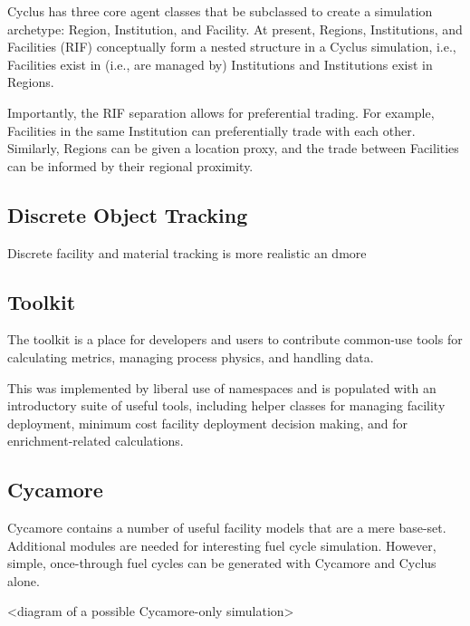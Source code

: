 Cyclus has three core agent classes that be subclassed to create a simulation
archetype: Region, Institution, and Facility. At present, Regions, Institutions,
and Facilities (RIF) conceptually form a nested structure in a Cyclus simulation,
i.e., Facilities exist in (i.e., are managed by) Institutions and Institutions
exist in Regions.

Importantly, the RIF separation allows for preferential trading. For example,
Facilities in the same Institution can preferentially trade with each
other. Similarly, Regions can be given a location proxy, and the trade between
Facilities can be informed by their regional proximity.

\subsection{Discrete Object Tracking}

Discrete facility and material tracking is more realistic an dmore 

\subsection{Toolkit}

The toolkit is a place for developers and users to contribute common-use tools 
for calculating metrics, managing process physics, and handling data.

This was implemented by liberal use of namespaces and is populated with an
introductory suite of useful tools, including helper classes for managing
facility deployment, minimum cost facility deployment decision making, and for
enrichment-related calculations.

\subsection{Cycamore}

Cycamore contains a number of useful facility models that are a mere base-set.
Additional modules are needed for interesting fuel cycle simulation. However,
simple, once-through fuel cycles can be generated with Cycamore and Cyclus alone.

<diagram of a possible Cycamore-only simulation>
